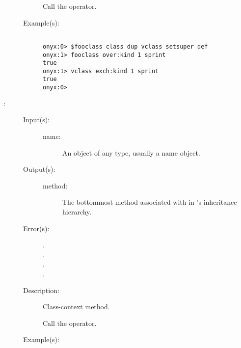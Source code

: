 \begin{description}
\begin{description}
		Call the  operator.
	\item[Example(s): ]\begin{verbatim}

onyx:0> $fooclass class dup vclass setsuper def
onyx:1> fooclass over:kind 1 sprint
true
onyx:1> vclass exch:kind 1 sprint
true
onyx:0>
		\end{verbatim}
	\end{description}
\label{vclass:method}
\item[{\onyxop{name}{method}{method}}: ]
	\begin{description}\item[]
	\item[Input(s): ]
		\begin{description}\item[]
		\item[name: ]
			An object of any type, usually a name object.
		\end{description}
	\item[Output(s): ]
		\begin{description}\item[]
		\item[method: ]
			The bottommost method associated with  in
			's inheritance hierarchy.
		\end{description}
	\item[Error(s): ]
		\begin{description}\item[]
		\item[.]
		\item[.]
		\item[.]
		\item[.]
		\end{description}
	\item[Description: ]
		Class-context method.

		Call the 
		operator.
	\item[Example(s): ]\begin{verbatim}


\end{verbatim}
\end{description}
\end{description}
